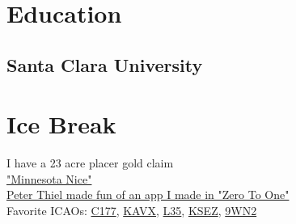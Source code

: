 \documentclass[]{plushcv}
\begin{document}
\begin{minipage}[t]{0.25\textwidth}


\section{Education} 
\subsection{Santa Clara University}

\section{Ice Break}
I have a 23 acre placer gold claim \\
\sectionsep
\href{https://www.youtube.com/watch?v=oiSzwoJr4-0}{"Minnesota Nice"} \\
\sectionsep
\href{https://books.google.com/books?id=Owc2nQEACAAJ&pg=PA75&source=gbs_selected_pages&cad=3#v=onepage&q=toilet+paper&f=false}{Peter Thiel made fun of an app I made in "Zero To One"} \\
\sectionsep
Favorite ICAOs: \href{https://romanch.uk/files/sedona.jpeg}{C177}, \href{https://www.airnav.com/airport/KAVX}{KAVX}, \href{https://www.airnav.com/airport/L35}{L35}, \href{https://www.airnav.com/airport/KSEZ}{KSEZ}, \href{https://romanch.uk/serve/image?key=9wn2.jpeg}{9WN2}


\end{minipage} 
\end{document}
